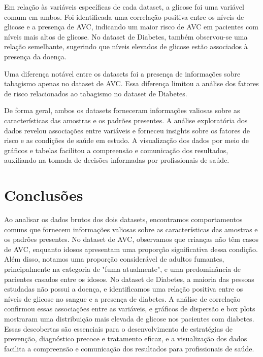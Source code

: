 \documentclass[conference]{IEEEtran}
\begin{document}
Em relação às variáveis específicas de cada dataset, a glicose foi uma variável comum em ambos. Foi identificada uma correlação positiva entre os níveis de glicose e a presença de AVC, indicando um maior risco de AVC em pacientes com níveis mais altos de glicose. No dataset de Diabetes, também observou-se uma relação semelhante, sugerindo que níveis elevados de glicose estão associados à presença da doença.

Uma diferença notável entre os datasets foi a presença de informações sobre tabagismo apenas no dataset de AVC. Essa diferença limitou a análise dos fatores de risco relacionados ao tabagismo no dataset de Diabetes.

De forma geral, ambos os datasets forneceram informações valiosas sobre as características das amostras e os padrões presentes. A análise exploratória dos dados revelou associações entre variáveis e forneceu insights sobre os fatores de risco e as condições de saúde em estudo. A visualização dos dados por meio de gráficos e tabelas facilitou a compreensão e comunicação dos resultados, auxiliando na tomada de decisões informadas por profissionais de saúde.




\section*{Conclusões}
Ao analisar os dados brutos dos dois datasets, encontramos comportamentos comuns que fornecem informações valiosas sobre as características das amostras e os padrões presentes. No dataset de AVC, observamos que crianças não têm casos de AVC, enquanto idosos apresentam uma proporção significativa dessa condição. Além disso, notamos uma proporção considerável de adultos fumantes, principalmente na categoria de "fuma atualmente", e uma predominância de pacientes casados entre os idosos. No dataset de Diabetes, a maioria das pessoas estudadas não possui a doença, e identificamos uma relação positiva entre os níveis de glicose no sangue e a presença de diabetes. A análise de correlação confirmou essas associações entre as variáveis, e gráficos de dispersão e box plots mostraram uma distribuição mais elevada de glicose nos pacientes com diabetes. Essas descobertas são essenciais para o desenvolvimento de estratégias de prevenção, diagnóstico precoce e tratamento eficaz, e a visualização dos dados facilita a compreensão e comunicação dos resultados para profissionais de saúde.
\end{document}
